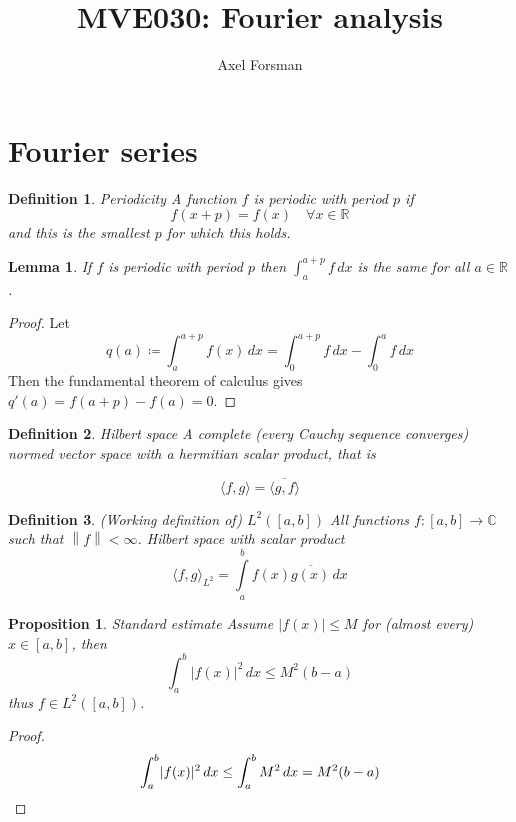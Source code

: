 \documentclass{article}
\title{MVE030: Fourier analysis}
\author{Axel Forsman}
\newtheorem{definition}{Definition}
\newtheorem{lemma}[theorem]{Lemma}
\newtheorem{proposition}{Proposition}
\newcommand{\norm}[1]{\left\lVert#1\right\rVert}
\begin{document}
\maketitle

\section{Fourier series}

\begin{definition}{Periodicity}
	A function $f$ is \emph{periodic} with period $p$ if
	$$ f(x + p) = f(x) \quad \forall x \in \mathbb R $$
	and this is the smallest $p$ for which this holds.
\end{definition}

\begin{lemma}
	If $f$ is periodic with period $p$ then
	$\int_a^{a + p} f \, dx$
	is the same for all $a \in \mathbb R$.
\end{lemma}

\begin{proof}
	Let
	$$ q(a) \coloneqq \int_a^{a + p} f(x) \, dx = \int_0^{a + p} f \, dx - \int_0^a f \, dx $$
	Then the fundamental theorem of calculus gives $ q'(a) = f(a + p) - f(a) = 0 $.
\end{proof}

\begin{definition}{Hilbert space}
	A complete (every Cauchy sequence converges) normed vector space
	with a hermitian scalar product, that is

	$$ \langle f, g \rangle = \overline{\langle g, f \rangle} $$
\end{definition}

\begin{definition}{(Working definition of) $L^2([a, b])$}
	All functions $f : [a, b] \to \mathbb C$ such that $\norm f < \infty$.
	Hilbert space with scalar product
	$$ \langle f, g \rangle_{L^2} = \int\limits_a^b f(x) \overline{g(x)} \, dx $$
\end{definition}

\begin{proposition}{Standard estimate}
	Assume $\lvert f(x) \rvert \le M$ for (almost every) $x \in [a, b]$, then
	$$ \int_a^b \lvert f(x) \rvert^2 \, dx \le M^2 (b - a) $$
	thus $f \in L^2([a, b])$.
\end{proposition}
\begin{proof}
	$$ \int_a^b \lvert f(x) \rvert^2 \, dx \le \int_a^b M^2 \, dx = M^2 (b - a) \qedhere $$
\end{proof}
\end{document}

